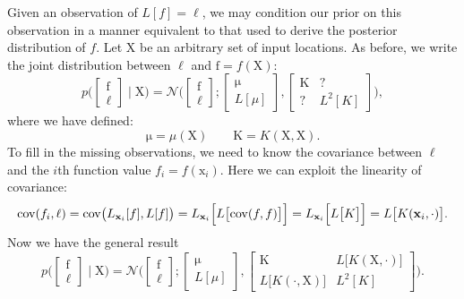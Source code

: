\documentclass{article}
\newcommand{\given}{\mid}
\newcommand{\mc}[1]{\mathcal{#1}}
\newcommand{\mat}[1]{\bm{\mathrm{#1}}}
\renewcommand{\vec}[1]{\bm{\mathrm{#1}}}
\DeclareMathOperator{\cov}{cov}
\begin{document}
Given an observation of $L[f] = \ell$, we may condition our prior on
this observation in a manner equivalent to that used to derive the
posterior distribution of $f$.  Let $\mat{X}$ be an arbitrary set of
input locations.  As before, we write the joint distribution between
$\ell$ and $\vec{f} = f(\mat{X})$:
\begin{equation*}
  p\Biggl(
  \begin{bmatrix}
    \vec{f}
    \\
    \ell
  \end{bmatrix}
  \given
  \vec{X}
  \Biggr)
  =
  \mc{N}
  \Biggl(
  \begin{bmatrix}
    \vec{f}
    \\
    \ell
  \end{bmatrix}
  ;
  \begin{bmatrix}
    \vec{\mu}
    \\
    L[\mu]
  \end{bmatrix}
  ,
  \begin{bmatrix}
    \mat{K} & \text{?}
    \\
    \text{?} & L^2[K]
  \end{bmatrix}
  \Biggr),
\end{equation*}
where we have defined:
\begin{equation*}
  \vec{\mu} = \mu(\mat{X})
  \qquad
  \mat{K} = K(\mat{X}, \mat{X}).
\end{equation*}
To fill in the missing observations, we need to know the covariance
between $\ell$ and the $i$th function value $f_i = f(\vec{x}_i)$.  Here
we can exploit the linearity of covariance:
\begin{equation*}
  \cov(f_i, \ell)
  =
  \cov\bigl(L_{\vec{x}_i}[f], L[f]\bigr)
  =
  L_{\vec{x}_i}\Bigl[L\bigl[
      \cov(f, f)
  \bigr]\Bigr]
  =
  L_{\vec{x}_i}\Bigl[L\bigl[
      K
  \bigr]\Bigr]
  =
  L\bigl[K(\vec{x}_i, \cdot)\bigr].
\end{equation*}
Now we have the general result
\begin{equation*}
  p\Biggl(
  \begin{bmatrix}
    \vec{f}
    \\
    \ell
  \end{bmatrix}
  \given
  \vec{X}
  \Biggr)
  =
  \mc{N}
  \Biggl(
  \begin{bmatrix}
    \vec{f}
    \\
    \ell
  \end{bmatrix}
  ;
  \begin{bmatrix}
    \vec{\mu}
    \\
    L[\mu]
  \end{bmatrix}
  ,
  \begin{bmatrix}
    \mat{K} & L\bigl[K(\mat{X}, \cdot)\bigr]
    \\
    L\bigl[K(\cdot, \mat{X})\bigr] & L^2[K]
  \end{bmatrix}
  \Biggr).
\end{equation*}
\end{document}
